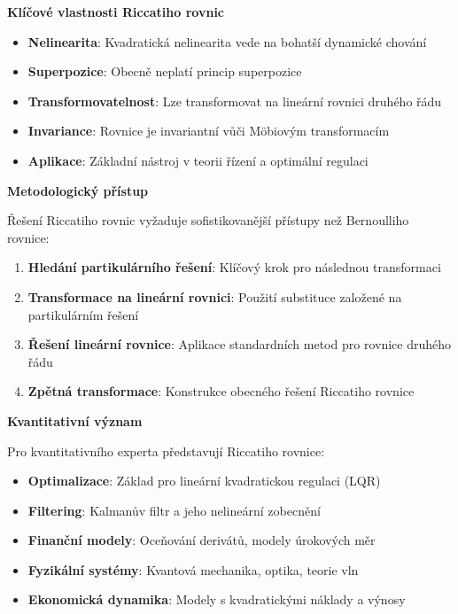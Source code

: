 \vspace{1\baselineskip}

\noindent\textbf{Klíčové vlastnosti Riccatiho rovnic}

\begin{itemize}
\item \textbf{Nelinearita}: Kvadratická nelinearita vede na bohatší dynamické chování
\item \textbf{Superpozice}: Obecně neplatí princip superpozice
\item \textbf{Transformovatelnost}: Lze transformovat na lineární rovnici druhého řádu
\item \textbf{Invariance}: Rovnice je invariantní vůči Möbiovým transformacím
\item \textbf{Aplikace}: Základní nástroj v teorii řízení a optimální regulaci
\end{itemize}

\vspace{1\baselineskip}

\noindent\textbf{Metodologický přístup}

Řešení Riccatiho rovnic vyžaduje sofistikovanější přístupy než Bernoulliho rovnice:
\begin{enumerate}
\item \textbf{Hledání partikulárního řešení}: Klíčový krok pro následnou transformaci
\item \textbf{Transformace na lineární rovnici}: Použití substituce založené na partikulárním řešení
\item \textbf{Řešení lineární rovnice}: Aplikace standardních metod pro rovnice druhého řádu
\item \textbf{Zpětná transformace}: Konstrukce obecného řešení Riccatiho rovnice
\end{enumerate}

\vspace{1\baselineskip}

\noindent\textbf{Kvantitativní význam}

Pro kvantitativního experta představují Riccatiho rovnice:
\begin{itemize}
\item \textbf{Optimalizace}: Základ pro lineární kvadratickou regulaci (LQR)
\item \textbf{Filtering}: Kalmanův filtr a jeho nelineární zobecnění
\item \textbf{Finanční modely}: Oceňování derivátů, modely úrokových měr
\item \textbf{Fyzikální systémy}: Kvantová mechanika, optika, teorie vln
\item \textbf{Ekonomická dynamika}: Modely s kvadratickými náklady a výnosy
\end{itemize}

